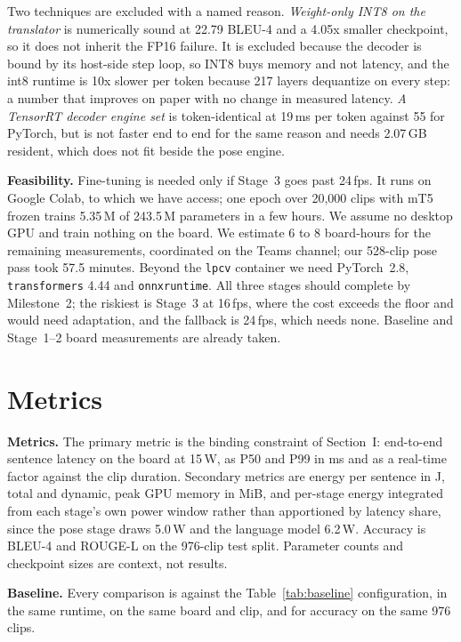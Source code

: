\documentclass[conference]{IEEEtran}
\begin{document}
Two techniques are excluded with a named reason. \emph{Weight-only INT8 on the
translator} is numerically sound at 22.79 BLEU-4 and a 4.05x smaller checkpoint, so it
does not inherit the FP16 failure. It is excluded because the decoder is bound by its
host-side step loop, so INT8 buys memory and not latency, and the int8 runtime is 10x
slower per token because 217 layers dequantize on every step: a number that improves
on paper with no change in measured latency. \emph{A TensorRT decoder engine set} is
token-identical at 19\,ms per token against 55 for PyTorch, but is not faster end to
end for the same reason and needs 2.07\,GB resident, which does not fit beside the
pose engine.

\textbf{Feasibility.} Fine-tuning is needed only if Stage~3 goes past 24\,fps. It runs
on Google Colab, to which we have access; one epoch over 20{,}000 clips with mT5
frozen trains 5.35\,M of 243.5\,M parameters in a few hours. We assume no desktop GPU
and train nothing on the board. We estimate 6 to 8 board-hours for the remaining
measurements, coordinated on the Teams channel; our 528-clip pose pass took 57.5
minutes. Beyond the \texttt{lpcv} container we need PyTorch~2.8,
\texttt{transformers} 4.44 and \texttt{onnxruntime}. All three stages should complete
by Milestone~2; the riskiest is Stage~3 at 16\,fps, where the cost exceeds the floor
and would need adaptation, and the fallback is 24\,fps, which needs none. Baseline and
Stage~1--2 board measurements are already taken.

\section{Metrics}

\label{m1}\textbf{Metrics.} The primary metric is the binding constraint of Section~I: end-to-end
sentence latency on the board at 15\,W, as P50 and P99 in ms and as a real-time factor
against the clip duration. Secondary metrics are energy per sentence in J, total and
dynamic, peak GPU memory in MiB, and per-stage energy integrated from each stage's own
power window rather than apportioned by latency share, since the pose stage draws
5.0\,W and the language model 6.2\,W. Accuracy is BLEU-4 and ROUGE-L on the 976-clip
test split. Parameter counts and checkpoint sizes are context, not results.

\label{m2}\textbf{Baseline.} Every comparison is against the Table~\ref{tab:baseline}
configuration, in the same runtime, on the same board and clip, and for accuracy on
the same 976 clips.
\end{document}
